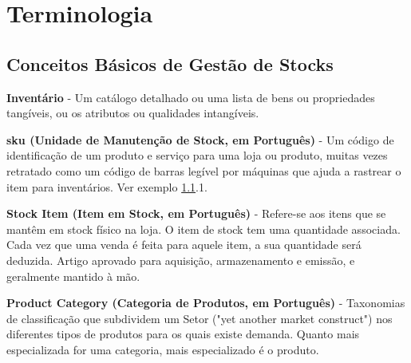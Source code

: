 %
%
\chapter{Terminologia} \label{a1}

%
%
\section{Conceitos Básicos de Gestão de Stocks} \label{seca11}

\vspace{0.2cm}
\textbf{Inventário} - Um catálogo detalhado ou uma lista de bens ou propriedades tangíveis, ou os atributos ou qualidades intangíveis.


\vspace{0.2cm}
\textbf{\acrfull{sku} (Unidade de Manutenção de Stock, em Português)} - Um código de identificação de um produto e serviço para uma loja ou produto, muitas vezes retratado como um código de barras legível por máquinas que ajuda a rastrear o item para inventários. Ver exemplo \ref{seca11}.1.

\noindent{}


\vspace{0.2cm}
\textbf{Stock Item (Item em Stock, em Português)} - Refere-se aos itens que se mantêm em stock físico na loja. O item de stock tem uma quantidade associada. Cada vez que uma venda é feita para aquele item, a sua quantidade será deduzida. 
Artigo aprovado para aquisição, armazenamento e emissão, e geralmente mantido à mão.



\vspace{0.2cm}
\textbf{Product Category (Categoria de Produtos, em Português)} - Taxonomias de classificação que subdividem um Setor ("yet another market construct") nos diferentes tipos de produtos para os quais existe demanda. Quanto mais especializada for uma categoria, mais especializado é o produto. 

